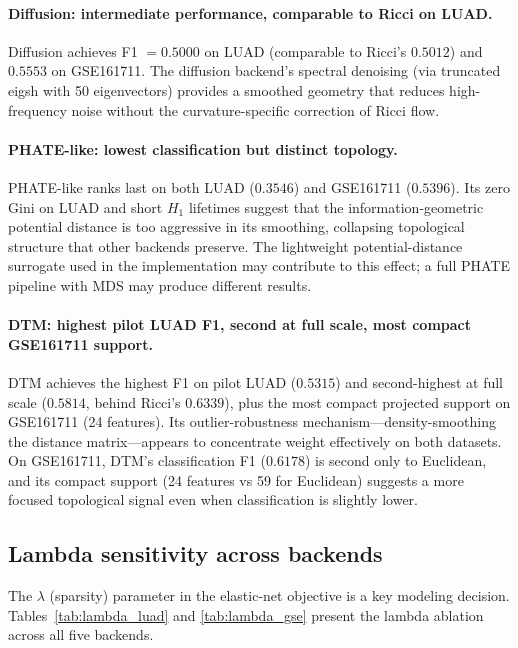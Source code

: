 \documentclass[11pt]{article}
\begin{document}
\paragraph{Diffusion: intermediate performance, comparable to Ricci on LUAD.}
Diffusion achieves F1 $= 0.5000$ on LUAD (comparable to Ricci's $0.5012$) and $0.5553$ on GSE161711.
The diffusion backend's spectral denoising (via truncated eigsh with 50 eigenvectors) provides a smoothed geometry that reduces high-frequency noise without the curvature-specific correction of Ricci flow.

\paragraph{PHATE-like: lowest classification but distinct topology.}
PHATE-like ranks last on both LUAD ($0.3546$) and GSE161711 ($0.5396$).
Its zero Gini on LUAD and short $H_1$ lifetimes suggest that the information-geometric potential distance is too aggressive in its smoothing, collapsing topological structure that other backends preserve.
The lightweight potential-distance surrogate used in the implementation may contribute to this effect; a full PHATE pipeline with MDS may produce different results.

\paragraph{DTM: highest pilot LUAD F1, second at full scale, most compact GSE161711 support.}
DTM achieves the highest F1 on pilot LUAD ($0.5315$) and second-highest at full scale ($0.5814$, behind Ricci's $0.6339$), plus the most compact projected support on GSE161711 (24 features).
Its outlier-robustness mechanism---density-smoothing the distance matrix---appears to concentrate weight effectively on both datasets.
On GSE161711, DTM's classification F1 ($0.6178$) is second only to Euclidean, and its compact support (24 features vs 59 for Euclidean) suggests a more focused topological signal even when classification is slightly lower.

\subsection{Lambda sensitivity across backends}

The $\lambda$ (sparsity) parameter in the elastic-net objective is a key modeling decision.
Tables~\ref{tab:lambda_luad} and \ref{tab:lambda_gse} present the lambda ablation across all five backends.
\end{document}
